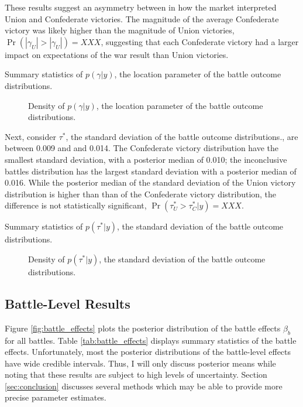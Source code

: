 \documentclass[11pt, oneside, article]{memoir}
\begin{document}
These results suggest an asymmetry between in how the market interpreted Union and Confederate victories.
The magnitude of the average Confederate victory was likely higher than the magnitude of Union victories, $\Pr(|\gamma_{U}| > |\gamma_{U}|) = XXX$, suggesting that each Confederate victory had a larger impact on expectations of the war result than Union victories.

\begin{table}[ht]
  \caption{Summary statistics of $p(\gamma|y)$, the location parameter of the battle outcome distributions.}
  \label{tab:gamma}
\end{table}

\begin{figure}[ht]
  \caption{Density of $p(\gamma|y)$, the location parameter of the battle outcome distributions.}
  \label{fig:gamma}
\end{figure}

Next, consider $\tau^{*}$, the standard deviation of the battle outcome distributions., are between 0.009 and and 0.014.
The Confederate victory distribution have the smallest standard deviation, with a posterior median of 0.010; 
the inconclusive battles distribution has the largest standard deviation with a posterior median of 0.016.
While the posterior median of the standard deviation of the Union victory distribution is higher than than of the Confederate victory distribution, the difference is not statistically significant, $\Pr(\tau^{*}_{U} > \tau^{*}_{C} | y) = XXX$.

\begin{table}[ht]
  \centering
  \caption{Summary statistics of $p(\tau^{*}|y)$, the standard deviation of the battle outcome distributions.}
  \label{tab:tau_star}
\end{table}

\begin{figure}[ht]
  \caption{Density of $p(\tau^{*}|y)$, the standard deviation of the battle outcome distributions.}
  \label{fig:tau_star}
\end{figure}

\subsection{Battle-Level Results}

Figure \ref{fig:battle_effects} plots the posterior distribution of the battle effects $\beta_{b}$ for all battles.
Table \ref{tab:battle_effects} displays summary statistics of the battle effects.
Unfortunately, most the posterior distributions of the battle-level effects have wide credible intervals.
Thus, I will only discuss posterior means while noting that these results are subject to high levels of uncertainty.
Section \ref{sec:conclusion} discusses several methods which may be able to provide more precise parameter estimates.
\end{document}
